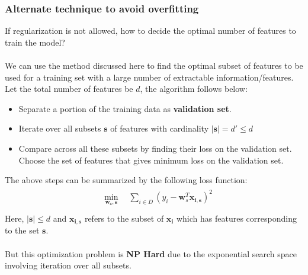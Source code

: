 \documentclass[12pt]{article}
\begin{document}
\subsubsection{Alternate technique to avoid overfitting}
If regularization is not allowed, how to decide the optimal number of features to train the model?\\
\\We can use the method discussed here to find the optimal subset of features to be used for a training set with a large number of extractable information/features. Let the total number of features be $d$, the algorithm follows below:
\begin{itemize}
    \item Separate a portion of the training data as \textbf{validation set}.
    \item Iterate over all subsets $\boldsymbol{s}$ of features with cardinality  $|\boldsymbol{s}| = d' \leq d$
    \item Compare across all these subsets by finding their loss on the validation set. Choose the set of features that gives minimum loss on the validation set.  
\end{itemize}
The above steps can be summarized by the following loss function:
\begin{gather}
    \begin{aligned}
        & \min_{\boldsymbol{w_s,s}} \quad \sum_{i \in D}   (y_i - \boldsymbol{w}^T_s\boldsymbol{x_{i,s}})^2          \nonumber\\
    \end{aligned}
\end{gather}
\noindent Here, $|\boldsymbol{s}|\leq d$  and $\boldsymbol{x_{i,s}}$ refers to the subset of $\boldsymbol{x_i}$ which has features corresponding to the set $\boldsymbol{s}$.
\\ \\
But this optimization problem is \textbf{NP Hard} due to the exponential search space involving iteration over all subsets. 
\end{document}
